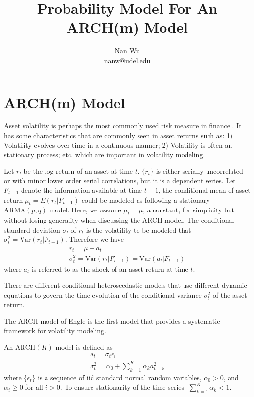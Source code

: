 \documentclass[12pt]{article}
\begin{document}
\title{Probability Model For An ARCH(m) Model}
\author{Nan Wu \\ nanw@udel.edu}
\date{}
\maketitle

\section{ARCH(m) Model}

Asset volatility is perhaps the most commonly used risk measure in finance \cite{tsay2014introduction}. It has some characteristics that are commonly seen in asset returns \cite{tsay2014introduction} such as: 1) Volatility evolves over time in a continuous manner; 2) Volatility is often an stationary process; etc. which are important in volatility modeling.

Let $r_t$ be the log return of an asset at time $t$. $\{r_t\}$ is either serially uncorrelated or with minor lower order serial correlations, but it is a dependent series. Let $F_{t-1}$ denote the information available at time $t-1$, the conditional mean of asset return $\mu_t = E\left(r_t \left| F_{t-1} \right.\right)$ could be modeled as following a stationary $\text{ARMA}(p,q)$ model. Here, we assume $\mu_t = \mu$, a constant, for simplicity but without losing generality when discussing the ARCH model. The conditional standard deviation $\sigma_t$ of $r_t$ is the volatility to be modeled that $\sigma_t^2 = \text{Var}\left(r_t \left|F_{t-1}\right.\right)$. Therefore we have
\begin{gather}
  r_t = \mu + a_t \\
  \sigma_t^2 = \text{Var}\left(r_t \left|F_{t-1}\right.\right) 
           = \text{Var}\left(a_t \left|F_{t-1}\right.\right)
\end{gather}
where $a_t$ is referred to as the shock of an asset return at time $t$.

There are different conditional heteroscedastic models that use different dynamic equations to govern the time evolution of the conditional variance $\sigma_t^2$ of the asset return.

The ARCH model of Engle \cite{engle1982} is the first model that provides a systematic framework for volatility modeling.

An $\text{ARCH}(K)$ model is defined as
\begin{gather}
  a_t = \sigma_t\epsilon_t \\
  \sigma_t^2 = \alpha_0 + \sum \limits_{k=1}^K \alpha_k a_{t-k}^2
\end{gather}
where $\{\epsilon_t\}$ is a sequence of iid standard normal random variables, $\alpha_0>0$, and $\alpha_i \ge 0$ for all $i>0$. To ensure stationarity of the time series, $\sum \limits_{k=1}^K \alpha_k < 1$.
\end{document}
